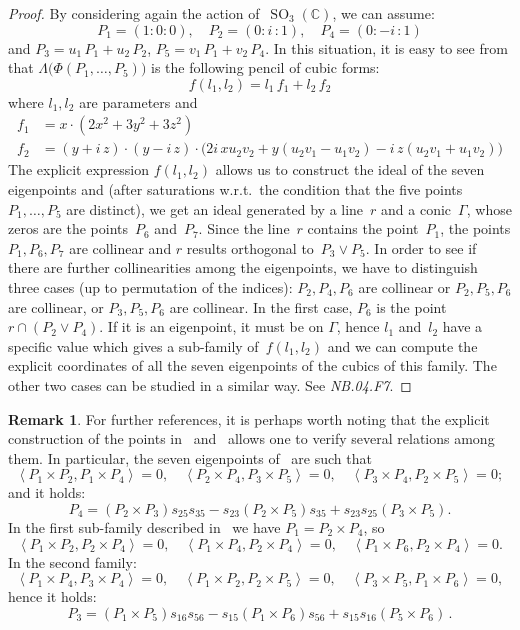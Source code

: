 \documentclass[a4paper, 11pt, reqno]{amsart}
\theoremstyle{plain}
\theoremstyle{definition}
\newtheorem{rmk}[lemma]{Remark}
\newcommand{\C}{\mathbb{C}}
\newcommand{\nb}[2]{\textsl{{NB}.{#1}.{#2}}}
\newcommand{\iii}{\textit{i}\,}
\newcommand{\SO}{\operatorname{SO}}
\newcommand{\scl}[2]{\left\langle {#1}, {#2} \right\rangle}
\begin{document}
\begin{proof}
By considering again the action of~$\SO_3(\C)$, we can assume:
%
\[
  P_1 = (1: 0: 0), \quad
  P_2 = (0: \iii: 1), \quad
  P_4 = (0: -\iii: 1)
\]
%
and $P_3 = u_1 \, P_1 + u_2 \, P_2$, $P_5 = v_1 \, P_1 + v_2 \, P_4$.
In this situation, it
is easy to see from  that $\Lambda\bigl(\Phi(P_1, \dots, P_5)\bigr)$
is the following pencil of cubic forms:
%
\[
  f(l_1, l_2) = l_1 \, f_1 + l_2 \, f_2
\]
%
where $l_1, l_2$ are parameters and
%
\begin{align*}
 f_1 & = x \cdot \left(2x^{2} + 3 y^{2} + 3 z^{2}\right)\\
  f_2 & = (y + \iii z) \cdot (y - \iii z)
  \cdot \bigl(2 \iii x u_{2} v_{2} + y (u_{2} v_{1}- u_{1} v_{2})
  - \iii z (u_{2} v_{1} + u_{1} v_{2})\bigr)
\end{align*}
%
The explicit expression $f(l_1, l_2)$ allows us to
construct the ideal of the seven eigenpoints and (after
saturations w.r.t.\ the condition that the five points $P_1, \dotsc, P_5$ are distinct),
we get an ideal generated by a line~$r$ and a conic~$\Gamma$, whose zeros are
the points~$P_6$ and~$P_7$. Since the line~$r$ contains the point~$P_1$,
the points $P_1, P_6, P_7$ are collinear and $r$ results orthogonal to~$P_3 \vee P_5$.
In order to see if there are further collinearities among the
eigenpoints, we have to distinguish three cases (up to permutation
of the indices): $P_2, P_4, P_6$ are collinear or $P_2, P_5, P_6$ are
collinear, or $P_3, P_5, P_6$ are collinear. In the first case, $P_6$
is the point $r \cap (P_2\vee P_4)$. If it is an eigenpoint, it must be
on $\Gamma$, hence $l_1$ and~$l_2$ have a specific value which gives a sub-family
of~$f(l_1, l_2)$ and we can compute the explicit coordinates of
all the seven eigenpoints of the cubics of this family. The other two
cases can be studied in a similar way. See \nb{04}{F7}.
\end{proof}

\begin{rmk}
\label{remark:three_orthog} For further references, it is perhaps worth noting that the explicit
construction of the
points in~ and~ allows one to verify
several relations among them. In particular, the seven eigenpoints
of~ are such that
\[
\scl{P_1\times P_2}{P_1 \times P_4}=0, \quad
\scl{P_2\times P_4}{P_3 \times P_5}=0, \quad
\scl{P_3\times P_4}{P_2 \times P_5}=0;
\]
and it holds:
\[
P_4 = (P_2\times P_3)s_{25}s_{35}-s_{23}(P_2\times P_5)s_{35}+ s_{23}s_{25}(P_3\times P_5).
\]
In the first sub-family described in~ we have
$P_1 = P_2 \times P_4$, so
\[
\scl{P_1\times P_2}{P_2 \times P_4}=0, \quad
\scl{P_1\times P_4}{P_2 \times P_4}=0, \quad
\scl{P_1\times P_6}{P_2 \times P_4}=0.
\]
In the second family:
\[
\scl{P_1\times P_4}{P_3 \times P_4}=0, \quad
\scl{P_1\times P_2}{P_2 \times P_5}=0, \quad
\scl{P_3\times P_5}{P_1 \times P_6}=0,
\]
hence it holds:
\[
P_3 = (P_1 \times P_5)s_{16}s_{56}-s_{15}(P_1\times P_6)s_{56}+s_{15}s_{16}(P_5 \times P_6) \,.
\]
\end{rmk}
%
\end{document}
